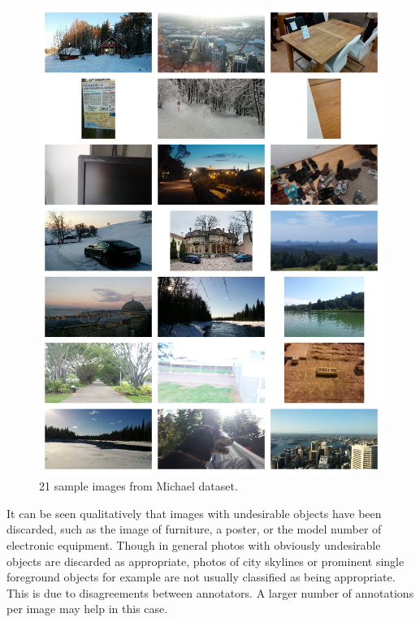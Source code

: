 \begin{figure}
\centering\includegraphics[width=0.9\columnwidth]{../figures/grid7x3_out1.png}
\caption{21 sample images from Michael dataset.\label{fig:selection_out1}}
\end{figure}

It can be seen qualitatively that images with undesirable objects have been
discarded, such as the image of furniture, a poster, or the model number
of electronic equipment.
Though in general photos with obviously undesirable objects are discarded as
appropriate, photos of city skylines or prominent single foreground objects for
example are not usually classified as being appropriate.
This is due to disagreements between annotators.
A larger number of annotations per image may help in this case.

